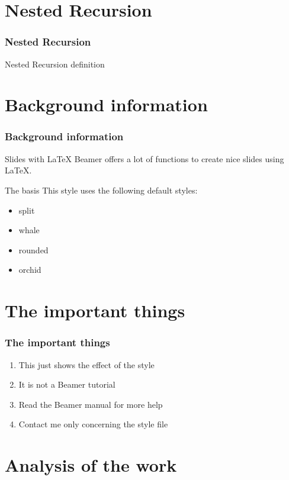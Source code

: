 \documentclass{beamer}
\begin{document}
\section{Nested Recursion}
\begin{frame}
	\frametitle{Nested Recursion}
	Nested Recursion definition
\end{frame}
\section{Background information}

\begin{frame}
	\frametitle{Background information}

	\begin{block}{Slides with \LaTeX}
	        Beamer offers a lot of functions to create nice slides using \LaTeX.
	\end{block}

	\begin{block}{The basis}
		This style uses the following default styles:
		\begin{itemize}
		    \item split
		    \item whale
		    \item rounded
		    \item orchid
		\end{itemize}
	\end{block}
\end{frame}

\section{The important things}

\begin{frame}
	\frametitle{The important things}

	\begin{enumerate}
	        \item This just shows the effect of the style
		\item It is not a Beamer tutorial
		\item Read the Beamer manual for more help
		\item Contact me only concerning the style file
	\end{enumerate}
\end{frame}

\section{Analysis of the work}
\end{document}
